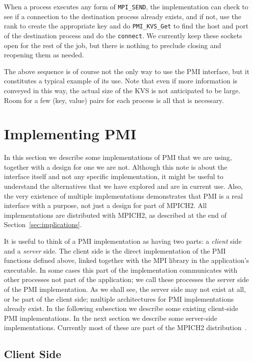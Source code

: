 \documentclass[11pt]{article}
\begin{document}
When a process executes any form of {\tt MPI\_SEND}, the
implementation can check to see if a connection to the destination
process already exists, and if not, use the rank to create the
appropriate key and do {\tt PMI\_KVS\_Get} to find the host and port of the
destination process and do the {\tt connect}.  We currently keep these
sockets open for the rest of the job, but there is nothing to preclude
closing and reopening them as needed.

The above sequence is of course not the only way to use the PMI
interface, but it constitutes a typical example of its use.  Note that
even if more information is conveyed in this way, the actual size of the
KVS is not anticipated to be large.  Room for a few (key, value) pairs
for each process is all that is necessary.

\section{Implementing PMI}
\label{sec:implementing}

In this section we describe some implementations of PMI that we are
using, together with a design for one we are not.  Although this note is
about the interface itself and not any specific implementation, it might
be useful to understand the alternatives that we have explored and are
in current use.  Also, the very existence of multiple implementations
demonstrates that PMI is a real interface with a purpose, not just a
design for part of MPICH2.  All implementations are distributed with
MPICH2, as described at the end of Section~\ref{sec:implications}.

It is useful to think of a PMI implementation as having two parts: a 
{\em client\/} side and a {\em server\/} side.  The client side is the
direct implementation of the PMI functions defined above, linked together
with the MPI library in the application's executable.  In some cases this
part of the implementation communicates with other processes not part of
the application;  we call these processes the server side of the PMI
implementation.  As we shall see, the server side may not exist at all,
or be part of the client side; multiple architectures for PMI
implementations already exist.  In the following subsection we describe some
existing client-side PMI implementations.  In the next section we
describe some server-side implementations.  Currently most of these are
part of the MPICH2 distribution~\cite{mpich2-web-page}.


\subsection{Client Side}
\label{sec:client-side}
\end{document}
